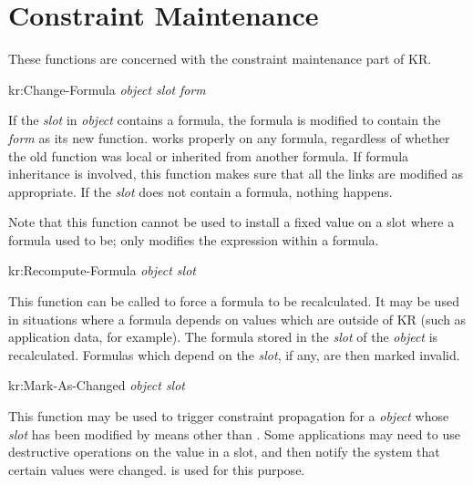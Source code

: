 \section{Constraint Maintenance}
\value{s-top}


These functions are concerned with the constraint maintenance part of KR.


\value{f-top}
\begin{example}
kr:Change-Formula {\it object slot} {\it form}\value{function}
\end{example}

If the {\it slot} in {\it object} contains a formula, the formula is modified
to contain the {\it form} as its new function.   works
properly on any formula, regardless of whether the old function was local
or inherited from another formula.  If formula inheritance is involved,
this function makes sure that all the links are modified as appropriate.
If the {\it slot} does not contain a formula, nothing happens.

Note that this function cannot be used to install a fixed value on a slot
where a formula used to be;  only modifies the expression
within a formula.



\value{f-top}
\begin{example}
kr:Recompute-Formula {\it object slot}\value{function}
\end{example}

This function can be called to force a formula to be recalculated.  It may
be used in situations where a formula depends on values which are outside
of KR (such as application data, for example).  The formula stored in the
{\it slot} of the {\it object} is recalculated.  Formulas which depend on the
{\it slot}, if any, are then marked invalid.



\value{f-top}
\begin{example}
kr:Mark-As-Changed {\it object slot}\value{function}
\end{example}

This function may be used to trigger constraint propagation for a
{\it object} whose {\it slot} has been modified by means other than
.  Some applications may need to use destructive operations on
the value in a slot, and then notify the system that certain values were
changed.   is used for this purpose.


